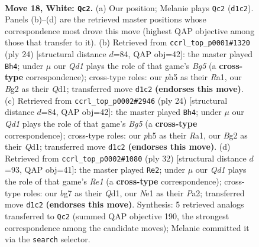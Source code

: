 \documentclass[11pt]{article}
\begin{document}
\clearpage

\begin{figure}[p]\centering
\begin{subfigure}{0.46\textwidth}\centering
\resizebox{\linewidth}{!}{%
\newchessgame
\chessboard[
  setfen={r3qrk1/5pb1/1pn2np1/p1p1P2p/2P3bP/BPN5/P2P2B1/1R1QNRK1 w - - 1 18},
  showmover=false,
  pgfstyle=straightmove, color=movearrow, markmove={d1-c2}
]}
\caption{}
\end{subfigure}\hfill
\begin{subfigure}{0.46\textwidth}\centering
\resizebox{\linewidth}{!}{%
\newchessgame
\chessboard[
  setfen={r2q1rk1/pp3pb1/3pbnpp/4n1B1/4P3/1NN5/PPP1B1PP/R2Q1RK1 w - - 0 13},
  showmover=false,
  pgfstyle=straightmove, color=movearrow, markmove={g5-h4}
]}
\caption{}
\end{subfigure}
\\[4pt]
\begin{subfigure}{0.46\textwidth}\centering
\resizebox{\linewidth}{!}{%
\newchessgame
\chessboard[
  setfen={r2q1rk1/pp3pb1/3pbnpp/4n1B1/4P3/1NN5/PPP1B1PP/R2Q1RK1 w - - 0 13},
  showmover=false,
  pgfstyle=straightmove, color=movearrow, markmove={g5-h4}
]}
\caption{}
\end{subfigure}\hfill
\begin{subfigure}{0.46\textwidth}\centering
\resizebox{\linewidth}{!}{%
\newchessgame
\chessboard[
  setfen={1q3rk1/1p3ppp/r1n1bn2/p7/1bNp3N/1P1P2P1/PB3PBP/2RQR1K1 w - - 2 17},
  showmover=false,
  pgfstyle=straightmove, color=movearrow, markmove={e1-e2}
]}
\caption{}
\end{subfigure}
\caption{\textbf{Move 18, White: \texttt{Qc2}.} (a) Our position; Melanie plays \texttt{Qc2} (\texttt{d1c2}). Panels (b)--(d) are the retrieved master positions whose correspondence most drove this move (highest QAP objective among those that transfer to it). (b) Retrieved from \texttt{ccrl\_top\_p0001\#1320} (ply 24) [structural distance $d$=84, QAP obj=42]: the master played \texttt{Bh4}; under $\mu$ our \emph{Qd1} plays the role of that game's \emph{Bg5} (a \textbf{cross-type} correspondence); cross-type roles: our \emph{p}h5 as their \emph{R}a1, our \emph{B}g2 as their \emph{Q}d1; transferred move \texttt{d1c2} \textbf{(endorses this move)}. (c) Retrieved from \texttt{ccrl\_top\_p0002\#2946} (ply 24) [structural distance $d$=84, QAP obj=42]: the master played \texttt{Bh4}; under $\mu$ our \emph{Qd1} plays the role of that game's \emph{Bg5} (a \textbf{cross-type} correspondence); cross-type roles: our \emph{p}h5 as their \emph{R}a1, our \emph{B}g2 as their \emph{Q}d1; transferred move \texttt{d1c2} \textbf{(endorses this move)}. (d) Retrieved from \texttt{ccrl\_top\_p0002\#1080} (ply 32) [structural distance $d$=93, QAP obj=41]: the master played \texttt{Re2}; under $\mu$ our \emph{Qd1} plays the role of that game's \emph{Re1} (a \textbf{cross-type} correspondence); cross-type roles: our \emph{b}g7 as their \emph{Q}d1, our \emph{N}e1 as their \emph{P}a2; transferred move \texttt{d1c2} \textbf{(endorses this move)}. Synthesis: 5 retrieved analogs transferred to \texttt{Qc2} (summed QAP objective 190, the strongest correspondence among the candidate moves); Melanie committed it via the \texttt{search} selector.}
\label{fig:thought-m34}
\end{figure}
\end{document}
